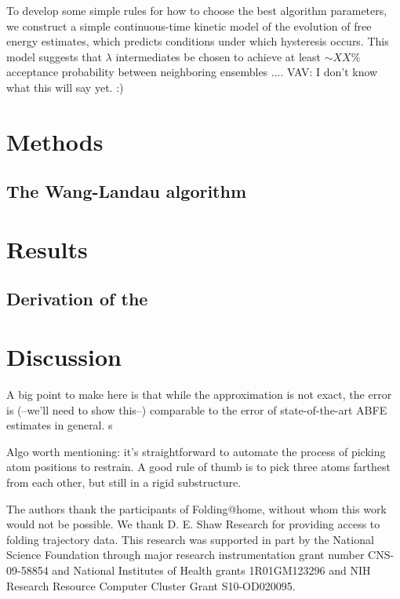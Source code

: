 \documentclass[%
 aip,
rsi,%
 amsmath,amssymb,
 reprint,%
]{revtex4-1}
\begin{document}
To develop some simple rules for how to choose the best algorithm parameters, we construct a simple continuous-time kinetic model of the evolution of free energy estimates, which predicts conditions under which hysteresis occurs.  \color{red} This model suggests that $\lambda$ intermediates be chosen to achieve at least $\sim XX\%$ acceptance probability between neighboring ensembles .... VAV:  I don't know what this will say yet. :) \color{black}

\section*{Methods}

\subsection{The Wang-Landau algorithm}




\section*{Results}

\subsection*{Derivation of the }





\section*{Discussion}


A big point to make here is that while the approximation is not exact, the error is (--we'll need to show this--) comparable to the error of state-of-the-art ABFE estimates in general.  s 

Algo worth mentioning: it's straightforward to automate the process of picking atom positions to restrain.  A good rule of thumb is to pick three atoms farthest from each other, but still in a rigid substructure. 


\begin{acknowledgments}
The authors thank the participants of Folding@home, without whom this work would not be possible.  We thank D. E. Shaw Research for providing access to folding trajectory data. This research was supported in part by the National Science Foundation through major research instrumentation grant number CNS-09-58854 and National Institutes of Health grants 1R01GM123296 and NIH Research Resource Computer Cluster Grant S10-OD020095.
\end{acknowledgments}
\end{document}
